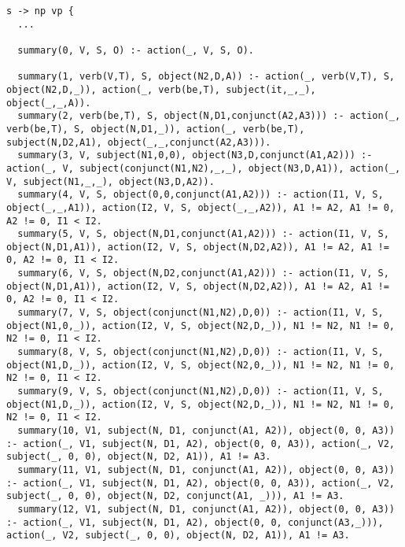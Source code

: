 \begin{lstlisting}
s -> np vp {
  ...

  summary(0, V, S, O) :- action(_, V, S, O).
  
  summary(1, verb(V,T), S, object(N2,D,A)) :- action(_, verb(V,T), S, object(N2,D,_)), action(_, verb(be,T), subject(it,_,_), object(_,_,A)).
  summary(2, verb(be,T), S, object(N,D1,conjunct(A2,A3))) :- action(_, verb(be,T), S, object(N,D1,_)), action(_, verb(be,T), subject(N,D2,A1), object(_,_,conjunct(A2,A3))).
  summary(3, V, subject(N1,0,0), object(N3,D,conjunct(A1,A2))) :- action(_, V, subject(conjunct(N1,N2),_,_), object(N3,D,A1)), action(_, V, subject(N1,_,_), object(N3,D,A2)).
  summary(4, V, S, object(0,0,conjunct(A1,A2))) :- action(I1, V, S, object(_,_,A1)), action(I2, V, S, object(_,_,A2)), A1 != A2, A1 != 0, A2 != 0, I1 < I2.
  summary(5, V, S, object(N,D1,conjunct(A1,A2))) :- action(I1, V, S, object(N,D1,A1)), action(I2, V, S, object(N,D2,A2)), A1 != A2, A1 != 0, A2 != 0, I1 < I2.
  summary(6, V, S, object(N,D2,conjunct(A1,A2))) :- action(I1, V, S, object(N,D1,A1)), action(I2, V, S, object(N,D2,A2)), A1 != A2, A1 != 0, A2 != 0, I1 < I2.
  summary(7, V, S, object(conjunct(N1,N2),D,0)) :- action(I1, V, S, object(N1,0,_)), action(I2, V, S, object(N2,D,_)), N1 != N2, N1 != 0, N2 != 0, I1 < I2.
  summary(8, V, S, object(conjunct(N1,N2),D,0)) :- action(I1, V, S, object(N1,D,_)), action(I2, V, S, object(N2,0,_)), N1 != N2, N1 != 0, N2 != 0, I1 < I2.
  summary(9, V, S, object(conjunct(N1,N2),D,0)) :- action(I1, V, S, object(N1,D,_)), action(I2, V, S, object(N2,D,_)), N1 != N2, N1 != 0, N2 != 0, I1 < I2.
  summary(10, V1, subject(N, D1, conjunct(A1, A2)), object(0, 0, A3)) :- action(_, V1, subject(N, D1, A2), object(0, 0, A3)), action(_, V2, subject(_, 0, 0), object(N, D2, A1)), A1 != A3.
  summary(11, V1, subject(N, D1, conjunct(A1, A2)), object(0, 0, A3)) :- action(_, V1, subject(N, D1, A2), object(0, 0, A3)), action(_, V2, subject(_, 0, 0), object(N, D2, conjunct(A1, _))), A1 != A3.
  summary(12, V1, subject(N, D1, conjunct(A1, A2)), object(0, 0, A3)) :- action(_, V1, subject(N, D1, A2), object(0, 0, conjunct(A3,_))), action(_, V2, subject(_, 0, 0), object(N, D2, A1)), A1 != A3.


\end{lstlisting}
